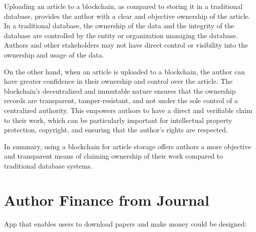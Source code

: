 \documentclass[lettersize,journal]{IEEEtran}
\begin{document}
Uploading an article to a blockchain, as compared to storing it in a traditional database, provides the author with a clear and objective ownership of the article. In a traditional database, the ownership of the data and the integrity of the database are controlled by the entity or organization managing the database. Authors and other stakeholders may not have direct control or visibility into the ownership and usage of the data.

On the other hand, when an article is uploaded to a blockchain, the author can have greater confidence in their ownership and control over the article. The blockchain's decentralized and immutable nature ensures that the ownership records are transparent, tamper-resistant, and not under the sole control of a centralized authority. This empowers authors to have a direct and verifiable claim to their work, which can be particularly important for intellectual property protection, copyright, and ensuring that the author's rights are respected.

In summary, using a blockchain for article storage offers authors a more objective and transparent means of claiming ownership of their work compared to traditional database systems.

\section{Author Finance from Journal}


App that enables users to download papers and make money could be designed:
\end{document}
